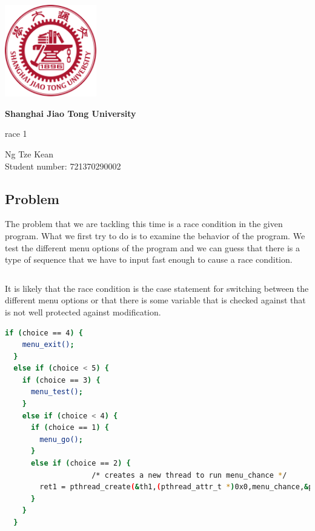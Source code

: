 \documentclass{article}
\begin{document}
\begin{titlepage}
  \begin{center}
    \vfill

    \includegraphics[width=4cm]{sjtu.png}

    \vspace{1cm}

    \textbf{\huge Shanghai Jiao Tong University}

    \vspace{0.5cm}

    {\large race 1}

    \vspace{1.5cm}

    Ng Tze Kean\\Student number: 721370290002

  \end{center}
\end{titlepage}

\subsection*{Problem}

The problem that we are tackling this time is a race condition in the given
program. What we first try to do is to examine the behavior of the program. We
test the different menu options of the program and we can guess that there is a
type of sequence that we have to input fast enough to cause a race condition.

\begin{lstlisting}[language=bash]

\end{lstlisting}

It is likely that the race condition is the case statement for switching
between the different menu options or that there is some variable that is
checked against that is not well protected against modification.

\begin{lstlisting}[language=bash]
  if (choice == 4) {
    menu_exit();
  }
  else if (choice < 5) {
    if (choice == 3) {
      menu_test();
    }
    else if (choice < 4) {
      if (choice == 1) {
        menu_go();
      }
      else if (choice == 2) {
                    /* creates a new thread to run menu_chance */
        ret1 = pthread_create(&th1,(pthread_attr_t *)0x0,menu_chance,&pstr1);
      }
    }
  }
\end{lstlisting}
\end{document}
